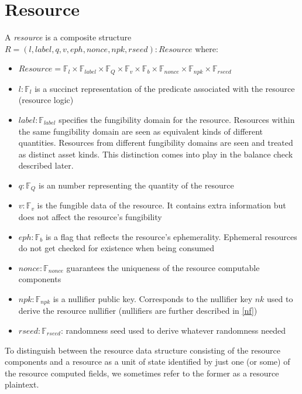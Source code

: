 


\section{Resource}
A \textit{resource} is a composite structure $R = (l, label, q, v, eph, nonce, npk, rseed): Resource$ where:
\begin{itemize}
    \item $Resource = \mathbb{F}_{l} \times \mathbb{F}_{label} \times \mathbb{F}_Q \times \mathbb{F}_{v} \times \mathbb{F}_b \times \mathbb{F}_{nonce} \times  \mathbb{F}_{npk} \times \mathbb{F}_{rseed}$ 
    \item $l: \mathbb{F}_{l}$ is a succinct representation of the predicate associated with the resource (resource logic)
    \item $label: \mathbb{F}_{label}$ specifies the fungibility domain for the resource. Resources within the same fungibility domain are seen as equivalent kinds of different quantities. Resources from different fungibility domains are seen and treated as distinct asset kinds. This distinction comes into play in the balance check described later.
    \item $q: \mathbb{F}_Q$ is an number representing the quantity of the resource
    \item $v: \mathbb{F}_{v}$ is the fungible data of the resource. It contains extra information but does not affect the resource's fungibility
    \item $eph: \mathbb{F}_b$ is a flag that reflects the resource's ephemerality. Ephemeral resources do not get checked for existence when being consumed
    \item $nonce: \mathbb{F}_{nonce}$ guarantees the uniqueness of the resource computable components
    \item $npk: \mathbb{F}_{npk}$ is a nullifier public key. Corresponds to the nullifier key $nk$ used to derive the resource nullifier (nullifiers are further described in \ref{nf})
    \item $rseed: \mathbb{F}_{rseed}$: randomness seed used to derive whatever randomness needed
\end{itemize}

To distinguish between the resource data structure consisting of the resource components and a resource as a unit of state identified by just one (or some) of the resource computed fields, we sometimes refer to the former as a resource plaintext.

